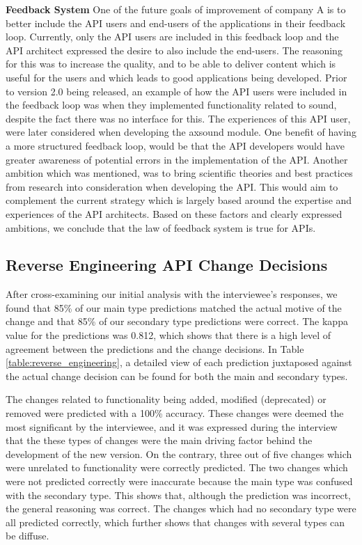 \documentclass{sig-alternate}
\begin{document}
\smallskip \noindent
\textbf{Feedback System  } 
One of the future goals of improvement of company A is to better include the API users and end-users of the applications in their feedback loop. Currently, only the API users are included in this feedback loop and the API architect expressed the desire to also include the end-users. The reasoning for this was to increase the quality, and to be able to deliver content which is useful for the users and which leads to good applications being developed. Prior to version 2.0 being released, an example of how the API users were included in the feedback loop was when they implemented functionality related to sound, despite the fact there was no interface for this.  The experiences of this API user, were later considered when developing the axsound module. One benefit of having a more structured feedback loop, would be that the API developers would have greater awareness of potential errors in the implementation of the API. Another ambition which was mentioned, was to bring scientific theories and best practices from research into consideration when developing the API. This would aim to complement the current strategy which is largely based around the expertise and experiences of the API architects. Based on these factors and clearly expressed ambitions, we conclude that the law of feedback system is true for APIs. 



\subsection{Reverse Engineering API Change Decisions}
After cross-examining our initial analysis with the interviewee's responses, we found that 85\% of our main type predictions matched the actual motive of the change and that 85\% of our secondary type predictions were correct. The kappa value \cite{cohen1968weighted} for the predictions was 0.812, which shows that there is a high level of agreement between the predictions and the change decisions. In Table \ref{table:reverse_engineering}, a detailed view of each prediction juxtaposed against the actual change decision can be found for both the main and secondary types.  

The changes related to functionality being added, modified (deprecated) or removed were predicted with a 100\% accuracy. These changes were deemed the most significant by the interviewee, and it was expressed during the interview that the these types of changes were the main driving factor behind the development of the new version. On the contrary, three out of five changes which were unrelated to functionality were correctly predicted. The two changes which were not predicted correctly were inaccurate because the main type was confused with the secondary type. This shows that, although the prediction was incorrect, the general reasoning was correct. The changes which had no secondary type were all predicted correctly, which further shows that changes with several types can be diffuse. 
\end{document}
